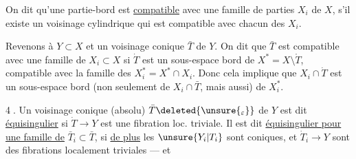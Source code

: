 On dit qu'une partie-bord  est \uline{compatible} avec
une famille de parties $X_i$ de $X$, s'il
existe un voisinage cylindrique qui est
compatible  avec chacun des $X_i$.

Revenons à $Y\subset X$ et un voisinage
conique  $\bar T$ de $Y$. On dit que $\bar T$ est
 compatible avec une famille de $X_i\subset X$
si 
$\dot T$ est un sous-espace bord de
$X^*=X\setminus\mathring T$, compatible avec la famille des
$X_i^*=X^*\cap X_i$. Donc cela implique que
$X_i\cap\dot T$ est un sous-espace bord (non seulement
de $X_i\cap\bar T$, mais aussi) de $X_i^*$.

\textcircled{4}.  Un voisinage conique (absolu)
$\bar T\deleted{\unsure{_\varepsilon}}$ de
$Y$ est dit \uline{équisingulier} si $\dot T\longrightarrow Y$ est une
fibration loc. triviale. Il est dit \uline{équisingulier
pour une famille de} $\bar T_i\subset\bar T$, si \uline{de plus}
les $\unsure{Y_i|T_i}$ sont coniques, et $\dot T_i\longrightarrow Y$ sont des
fibrations localement triviales --- et 

